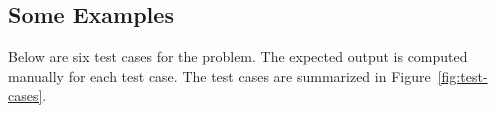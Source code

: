 \documentclass[11pt]{scrartcl}
\theoremstyle{plain}
\theoremstyle{definition}
\theoremstyle{remark}
\newcounter{problem}
\begin{document}
\subsection{Some Examples}
Below are six test cases for the problem. The expected output is computed manually for each test case. The test cases are summarized in Figure~\ref{fig:test-cases}.
\begin{figure}[H]
\centering
\begingroup
\setlength{\tabcolsep}{0pt}
\renewcommand{\arraystretch}{1}

\newcommand{\celltitle}[1]{%
  \colorbox{blue!4!gray!6}{%
    \parbox[c][0.55cm][c]{\dimexpr\linewidth-2\fboxsep\relax}{\centering\bfseries #1}%
  }%
}

\newcommand{\celldiagram}[1]{%
  \parbox[c][6cm][c]{\linewidth}{%
    \centering #1%
  }%
}

\newcommand{\celldiagramshort}[1]{%
  \parbox[c][3.5cm][c]{\linewidth}{%
    \centering #1%
  }%
}

\newcommand{\cellinfo}[3]{%
  \colorbox{blue!4!gray!6}{%
    \parbox[c][1.05cm][c]{\dimexpr\linewidth-2\fboxsep\relax}{%
      \centering $n=#1$, $k=#2$\\[3pt] Expected output $=#3$
    }%
  }%
}



\end{figure}
\end{document}
